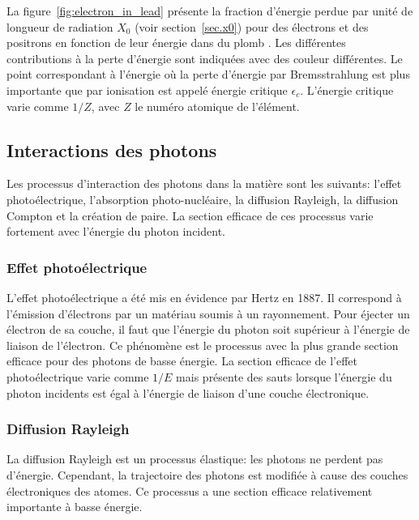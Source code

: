  La figure~\ref{fig:electron_in_lead} présente la fraction d'énergie perdue par unité de longueur de radiation $X_0$ (voir section~\ref{sec.x0}) pour des électrons et des positrons en fonction de leur énergie dans du plomb \cite{pdg}. Les différentes contributions à la perte d'énergie sont indiquées avec des couleur différentes. Le point correspondant à l'énergie où la perte d'énergie par Bremsstrahlung est plus importante que par ionisation est appelé énergie critique $\epsilon_c$. L'énergie critique varie comme $1/Z$, avec $Z$ le numéro atomique de l'élément.

\subsection{Interactions des photons}
\label{sec.photon_in_matter}
Les processus d'interaction des photons dans la matière sont les suivants: l'effet photoélectrique, l'absorption photo-nucléaire, la diffusion Rayleigh, la diffusion Compton et la création de paire. La section efficace de ces processus varie fortement avec l'énergie du photon incident. 
\subsubsection{Effet photoélectrique}
L'effet photoélectrique a été mis en évidence par Hertz en 1887. Il correspond à l'émission d'électrons par un matériau soumis à un rayonnement. Pour éjecter un électron de sa couche, il faut que l'énergie du photon soit supérieur à l'énergie de liaison de l'électron. Ce phénomène est le processus avec la plus grande section efficace pour des photons de basse énergie. La section efficace de l'effet photoélectrique varie comme $1/E$ mais présente des sauts lorsque l'énergie du photon incidents est égal à l'énergie de liaison d'une couche électronique.
\subsubsection{Diffusion Rayleigh}
La diffusion Rayleigh est un processus élastique: les photons ne perdent pas d'énergie. Cependant, la trajectoire des photons est modifiée à cause des couches électroniques des atomes. Ce processus a une section efficace relativement importante à basse énergie.
